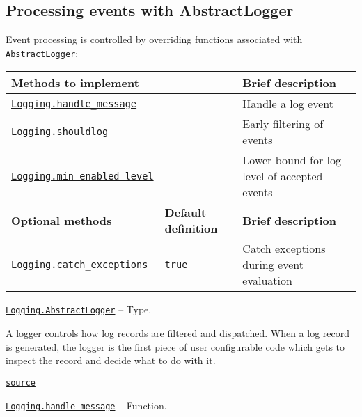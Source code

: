 \hypertarget{10335028777960461011}{}


\subsection{Processing events with AbstractLogger}



Event processing is controlled by overriding functions associated with \texttt{AbstractLogger}:




\begin{table}[h]

\begin{tabulary}{\linewidth}{|L|L|L|}
\hline
Methods to implement &  & Brief description \\
\hline
\hyperlink{1528450952930149457}{\texttt{Logging.handle\_message}} &  & Handle a log event \\
\hline
\hyperlink{10642364941499317938}{\texttt{Logging.shouldlog}} &  & Early filtering of events \\
\hline
\hyperlink{1177702033979282781}{\texttt{Logging.min\_enabled\_level}} &  & Lower bound for log level of accepted events \\
\hline
\textbf{Optional methods} & \textbf{Default definition} & \textbf{Brief description} \\
\hline
\hyperlink{13546483368377724892}{\texttt{Logging.catch\_exceptions}} & \texttt{true} & Catch exceptions during event evaluation \\
\hline
\end{tabulary}

\end{table}


\hypertarget{16983066617679297643}{} 
\hyperlink{16983066617679297643}{\texttt{Logging.AbstractLogger}}  -- {Type.}

\begin{adjustwidth}{2em}{0pt}

A logger controls how log records are filtered and dispatched.  When a log record is generated, the logger is the first piece of user configurable code which gets to inspect the record and decide what to do with it.



\href{https://github.com/JuliaLang/julia/blob/44fa15b1502a45eac76c9017af94332d4557b251/base/logging.jl#L24-L28}{\texttt{source}}


\end{adjustwidth}
\hypertarget{1528450952930149457}{} 
\hyperlink{1528450952930149457}{\texttt{Logging.handle\_message}}  -- {Function.}

